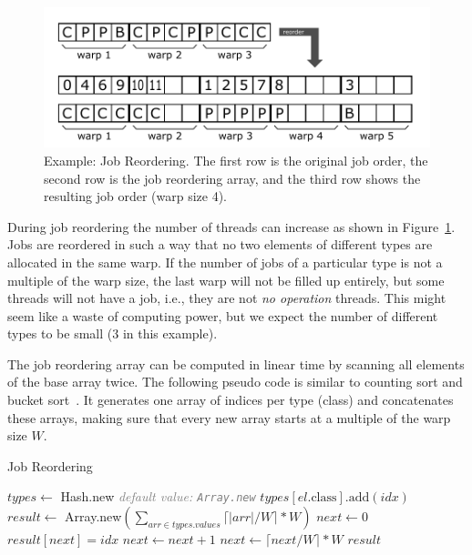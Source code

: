 \documentclass[preprint]{sigplanconf}
\begin{document}
\begin{figure}[!htp]
    \centering
    \includegraphics[width=\columnwidth]{reorder_example.pdf}
    \caption{Example: Job Reordering. The first row is the original job order, the second row is the job reordering array, and the third row shows the resulting job order (warp size 4).}
    \label{fig:ex_job_reorder}
\end{figure}

During job reordering the number of threads can increase as shown in Figure~\ref{fig:ex_job_reorder}. Jobs are reordered in such a way that no two elements of different types are allocated in the same warp. If the number of jobs of a particular type is not a multiple of the warp size, the last warp will not be filled up entirely, but some threads will not have a job, i.e., they are not \emph{no operation} threads. This might seem like a waste of computing power, but we expect the number of different types to be small (3 in this example).

The job reordering array can be computed in linear time by scanning all elements of the base array twice. The following pseudo code is similar to counting sort and bucket sort~\cite{Corwin:2004:SLT:1040231.1040257}. It generates one array of indices per type (class) and concatenates these arrays, making sure that every new array starts at a multiple of the warp size $W$.

\begin{algorithm}
\caption{Job Reordering}
\label{CHalgorithm}
\begin{algorithmic}[1]
\State $\mathit{types} \gets$ Hash.new \hfill \textit{\textcolor{gray}{default value: \texttt{Array.new}}}
    \State $\mathit{types}[\mathit{el}.\mbox{class}].\mbox{add}(\mathit{idx})$
\EndFor
\State $\mathit{result} \gets$ Array.new$(\sum_{\mathit{arr} \in \mathit{types}.\mathit{values}} \lceil |\mathit{arr}| / W \rceil * W)$
\State $\mathit{next} \gets 0$
        \State $\mathit{result}[\mathit{next}] = \mathit{idx}$
        \State $\mathit{next} \gets \mathit{next} + 1$
    \EndFor
    \State $\mathit{next} \gets \lceil \mathit{next} / W \rceil * W$
\EndFor
\State \Return $\mathit{result}$
\EndProcedure
\end{algorithmic}
\end{algorithm}
\end{document}
